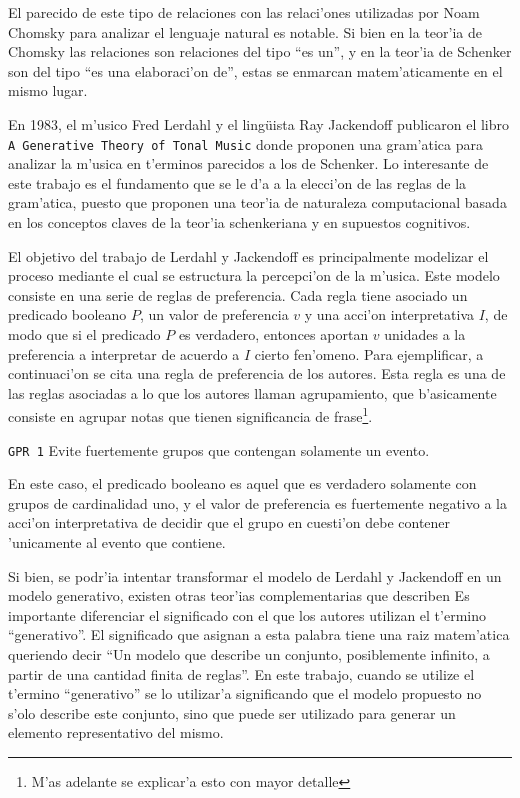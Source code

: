 El parecido de este tipo de relaciones con las relaci'ones utilizadas por Noam Chomsky para analizar el lenguaje natural es notable. 
Si bien en la teor'ia de Chomsky las relaciones son relaciones del tipo ``es un'', y en la teor'ia de Schenker son del tipo ``es una elaboraci'on de'', 
estas se enmarcan matem'aticamente en el mismo lugar.  

En 1983, el m'usico Fred Lerdahl y el ling\"uista Ray Jackendoff publicaron el libro 
\texttt{A Generative Theory of Tonal Music} donde proponen una gram'atica para analizar la m'usica en t'erminos parecidos a los de Schenker. 
Lo interesante de este trabajo es el fundamento que se le d'a a la elecci'on de las reglas de la gram'atica, puesto que proponen una teor'ia 
de naturaleza computacional basada en los conceptos claves de la teor'ia schenkeriana y en supuestos cognitivos. 

El objetivo del trabajo de Lerdahl y Jackendoff es principalmente modelizar el proceso mediante el cual se estructura la percepci'on de la m'usica. 
Este modelo consiste en una serie de reglas de preferencia. Cada regla tiene asociado un predicado booleano $P$, un valor de preferencia $v$ y una acci'on interpretativa 
$I$, de modo que si el predicado $P$ es verdadero, entonces aportan $v$ unidades a la preferencia a interpretar de acuerdo a $I$ cierto fen'omeno. 
Para ejemplificar, a continuaci'on se cita una regla de preferencia de los autores. Esta regla es una de las reglas asociadas a lo que los autores 
llaman agrupamiento, que b'asicamente consiste en agrupar notas que tienen significancia de frase\footnote{M'as adelante se explicar'a esto con mayor detalle}.

\begin{center}
\texttt{GPR 1} Evite fuertemente grupos que contengan solamente un evento.
\end{center}

En este caso, el predicado booleano es aquel que es verdadero solamente con grupos de cardinalidad uno, y el valor de preferencia es fuertemente 
negativo a la acci'on interpretativa de decidir que el grupo en cuesti'on debe contener 'unicamente al evento que contiene. 

Si bien, se podr'ia intentar transformar el modelo de Lerdahl y Jackendoff en un modelo generativo, existen otras teor'ias complementarias que describen
Es importante diferenciar el significado con el que los autores utilizan el t'ermino ``generativo''\citep[p. 6]{LerdahlJackendoff83}. El significado que asignan 
a esta palabra tiene una raiz matem'atica queriendo decir ``Un modelo que describe un conjunto, posiblemente infinito, a partir
de una cantidad finita de reglas''. En este trabajo, cuando se utilize el t'ermino ``generativo'' se lo utilizar'a significando que el modelo propuesto
no s'olo describe este conjunto, sino que puede ser utilizado para generar un elemento representativo del mismo.

